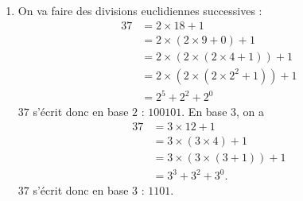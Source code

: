 \documentclass[11pt,a4paper]{article}
\begin{document}
\begin{corrige}
\begin{enumerate}
\begin{enumerate}
				\item  On écrit simplement que 
				$$\sum_{k=0}^{\ell-1} c_k b^k\leq (b-1)\sum_{k=0}^{\ell-1}b^k=b^\ell-1<b^\ell$$
				où on a reconnu une somme géométrique.
				
				\item  Supposons par exemple que $a_\ell>a'_\ell$. On a alors, puisque $|a'_k-a_k|\leq b-1$,
				$$\left|\sum_{k=0}^{\ell-1} (a'_k-a_k)b^k\right|\leq\sum_{k=0}^{\ell-1} |a'_k-a_k| b^k<b^{\ell}\leq (a_\ell-a'_\ell)b^\ell$$
				ce qui contredit l'hypothèse faite. On a donc bien démontré l'unicité de la décomposition en base b.
				
			\end{enumerate}
			
			
			\item  On va faire des divisions euclidiennes successives :
			\begin{align*}
				37&=2\times 18+1\\
				&=2\times (2\times 9+0)+1\\
				&=2\times (2\times (2\times 4+1))+1\\
				&=2\times (2\times (2\times 2^2+1))+1\\
				&=2^5+2^2+2^0
			\end{align*}
			$37$ s'écrit donc en base $2$ : $100101$. En base 3, on a 
			\begin{align*}
				37&=3\times 12+1\\
				&=3\times ( 3\times 4)+1\\
				&=3\times ( 3\times(3+1))+1\\
				&=3^3+3^2+3^0.
			\end{align*}
			$37$ s'écrit donc en base $3$ : $1101$.
			
		\end{enumerate}
	\end{corrige}
	
\end{document}
